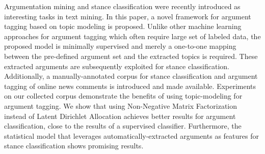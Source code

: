 Argumentation mining and stance classification were recently introduced as interesting tasks in text mining. In this paper, a novel framework for argument tagging based on topic modeling is proposed. Unlike other machine learning approaches for argument tagging which often require large set of labeled data, the proposed model is minimally supervised and merely a one-to-one mapping between the pre-defined argument set and the extracted topics is required. These extracted arguments are subsequently  exploited for stance classification.  Additionally, a manually-annotated corpus for stance classification and argument tagging of online news comments is introduced and made available. Experiments on our collected corpus demonstrate the benefits of using topic-modeling for argument tagging. We show that using Non-Negative Matrix Factorization instead of Latent Dirichlet Allocation achieves better results for argument classification, close to the results of a supervised classifier. Furthermore, the statistical model that leverages automatically-extracted arguments as features for stance classification shows promising results.
